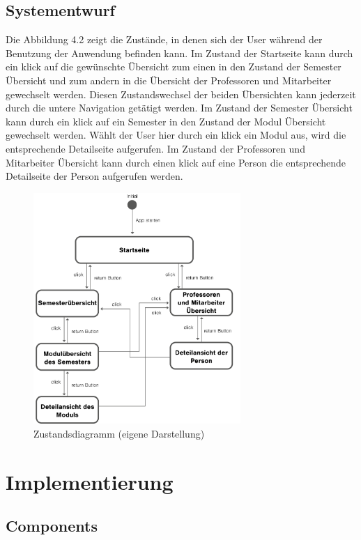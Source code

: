 \documentclass[12pt,					%
							 oneside,			%
							 a4paper,			%
							 halfparskip,		%
							 liststotoc,			%
							 bibtotoc,			%
							 fleqn,				%
							 pointlessnumbers]	%
							 {scrreprt}
\begin{document}
		\section{Systementwurf}
		Die Abbildung 4.2 zeigt die Zustände, in denen sich der User während der Benutzung der Anwendung befinden kann. Im Zustand der Startseite kann durch ein klick auf die gewünschte Übersicht zum einen in den Zustand der Semester Übersicht und zum andern in die Übersicht der Professoren und Mitarbeiter gewechselt werden. Diesen Zustandswechsel der beiden Übersichten kann jederzeit durch die untere Navigation getätigt werden. Im Zustand der Semester Übersicht kann durch ein klick auf ein Semester in den Zustand der Modul Übersicht gewechselt werden. Wählt der User hier durch ein klick ein Modul aus, wird die entsprechende Detailseite aufgerufen. Im Zustand der Professoren und Mitarbeiter Übersicht kann durch einen klick auf eine Person die entsprechende Detailseite der Person aufgerufen werden.
		
		
		\begin{figure}[h]
						\centering
						\includegraphics[width=0.7\textwidth]{pictures/zustandsdiagram.png}
						\caption{Zustandsdiagramm (eigene Darstellung)}						
						\label{Zustandsdiagramm}
					\end{figure}
		
\chapter{Implementierung}  

	\section{Components}
\end{document}
